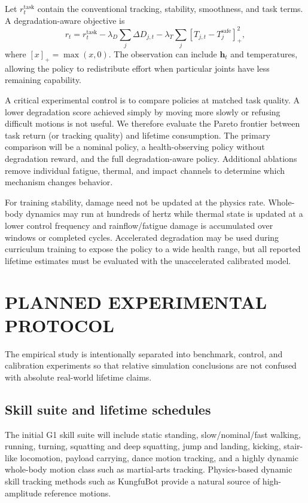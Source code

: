 \documentclass[letterpaper,10pt,conference]{ieeeconf}
\begin{document}
Let $r_t^{\mathrm{task}}$ contain the conventional tracking, stability, smoothness, and task terms. A degradation-aware objective is
\begin{equation}
 r_t = r_t^{\mathrm{task}}
 -\lambda_D\sum_j \Delta D_{j,t}
 -\lambda_T\sum_j [T_{j,t}-T_{j}^{\mathrm{safe}}]_+^2,
\label{eq:reward}
\end{equation}
where $[x]_+=\max(x,0)$. The observation can include $\mathbf{h}_t$ and temperatures, allowing the policy to redistribute effort when particular joints have less remaining capability.

A critical experimental control is to compare policies at matched task quality. A lower degradation score achieved simply by moving more slowly or refusing difficult motions is not useful. We therefore evaluate the Pareto frontier between task return (or tracking quality) and lifetime consumption. The primary comparison will be a nominal policy, a health-observing policy without degradation reward, and the full degradation-aware policy. Additional ablations remove individual fatigue, thermal, and impact channels to determine which mechanism changes behavior.

For training stability, damage need not be updated at the physics rate. Whole-body dynamics may run at hundreds of hertz while thermal state is updated at a lower control frequency and rainflow/fatigue damage is accumulated over windows or completed cycles. Accelerated degradation may be used during curriculum training to expose the policy to a wide health range, but all reported lifetime estimates must be evaluated with the unaccelerated calibrated model.

\section{PLANNED EXPERIMENTAL PROTOCOL}

The empirical study is intentionally separated into benchmark, control, and calibration experiments so that relative simulation conclusions are not confused with absolute real-world lifetime claims.

\subsection{Skill suite and lifetime schedules}

The initial G1 skill suite will include static standing, slow/nominal/fast walking, running, turning, squatting and deep squatting, jump and landing, kicking, stair-like locomotion, payload carrying, dance motion tracking, and a highly dynamic whole-body motion class such as martial-arts tracking. Physics-based dynamic skill tracking methods such as KungfuBot \cite{xie2025kungfubot} provide a natural source of high-amplitude reference motions.
\end{document}

